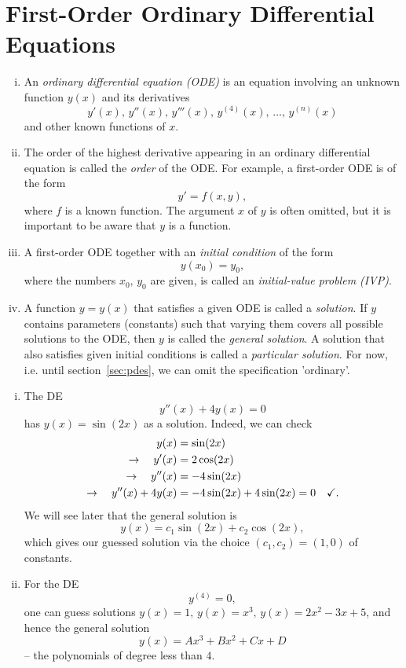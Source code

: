 \section{First-Order Ordinary Differential Equations}
\label{sec:f-o}

\begin{definition}
\label{def:f-o}
\begin{enumerate}[(i)]
	\item An \emph{ordinary differential equation (ODE)} is an equation involving an unknown function $y(x)$ and its derivatives
	\[ y'(x),\,y''(x),\,y'''(x),\,y^{(4)}(x),\,\dots,\,y^{(n)}(x) \]
	and other known functions of $x$.
	\item The order of the highest derivative appearing in an ordinary differential equation is called the \emph{order} of the ODE. For example, a first-order ODE is of the form
	\[ y' = f(x,y), \]
	where $f$ is a known function. The argument $x$ of $y$ is often omitted, but it is important to be aware that $y$ is a function.
	\item A first-order ODE together with an \emph{initial condition} of the form
	\[ y(x_0)=y_0, \]
	where the numbers $x_0,\,y_0$ are given, is called an \emph{initial-value problem (IVP)}.
	\item A function $y=y(x)$ that satisfies a given ODE is called a \emph{solution}. If $y$ contains parameters (constants) such that varying them covers all possible solutions to the ODE, then $y$ is called the \emph{general solution}. A solution that also satisfies given initial conditions is called a \emph{particular solution}. For now, i.e. until section~\ref{sec:pdes}, we can omit the specification 'ordinary'.
\end{enumerate}
\end{definition}

\begin{example}
\label{exple:first_de_exples}
\begin{enumerate}[(i)]
	\item The DE
	\[ y''(x)+4y(x)=0 \]
	has $y(x)=\sin(2x)$ as a solution. Indeed, we can check
	\begin{equation*}
	\begin{split}
	y(x) & =\sin(2x) \\
	\rightarrow \quad y'(x) & =2\cos(2x) \\
	\rightarrow \quad y''(x) & =-4\sin(2x) \\
	\rightarrow \quad y''(x) +4y(x) & = -4\sin(2x) + 4\sin(2x) = 0 \quad \text{\checkmark}.
	\end{split}
	\end{equation*}
	We will see later that the general solution is
	\[ y(x)=c_1\sin(2x)+c_2\cos(2x), \]
	which gives our guessed solution via the choice $(c_1,c_2)=(1,0)$ of constants.
	\item For the DE
	\[ y^{(4)} = 0, \]
	one can guess solutions $y(x)=1,\,y(x)=x^3,\,y(x)=2x^2-3x+5$, and hence the general solution
	\[ y(x) = Ax^3+Bx^2+Cx+D \]
	-- the polynomials of degree less than $4$.
\end{enumerate}
\end{example}

